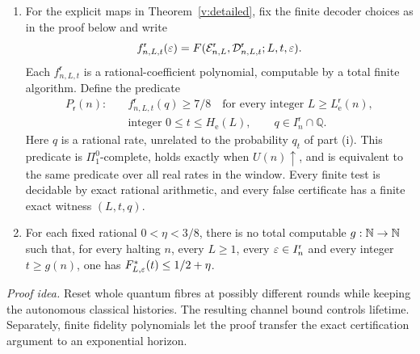 \begin{proposition}
\begin{enumerate}
\begin{equation}
 \quad(L\ge1),\qquad
 \tau_{L,\eps}<2^{L^5}
 \quad(L\ge k_{\mathsf r}j_n^{\mathsf r}+3).
\end{equation}
If \(U(n)\uparrow\), then for every
\(L\ge L_{\mathrm e}^{\mathsf r}(n)\),
\[
 H_{\mathrm e}(L)\le\tau_{L,\eps}
 <2^{(k_{\mathsf r}j_n^{\mathsf r}+3)L^4}.
\]
\item For the explicit maps in Theorem~\ref{v:detailed}, fix the finite
decoder choices as in the proof below and write
\[
 f^{\mathsf r}_{n,L,t}(\varepsilon)=
 F(\mathcal E^{\mathsf r}_{n,L},\mathcal D^{\mathsf r}_{n,L,t};L,t,\varepsilon).
\]
Each \(f^{\mathsf r}_{n,L,t}\) is a rational-coefficient polynomial,
computable by a total finite algorithm. Define the predicate
\begin{equation}\label{v:predicate}
\begin{split}
 P_{\mathsf r}(n):\quad& f^{\mathsf r}_{n,L,t}(q)\ge7/8
 \quad\text{for every integer }L\ge L_{\mathrm e}^{\mathsf r}(n),\\
 &\text{integer }0\le t\le H_{\mathrm e}(L),\qquad
  q\in I_n^{\mathsf r}\cap\mathbb Q.
\end{split}
\end{equation}
Here \(q\) is a rational rate, unrelated to the probability \(q_t\)
of part (i). This predicate is \(\Pi^0_1\)-complete, holds exactly
when \(U(n)\uparrow\), and is equivalent to the same predicate over
all real rates in the window.
Every finite test is decidable by exact rational arithmetic, and every
false certificate has a finite exact witness \((L,t,q)\).
\item For each fixed rational \(0<\eta<3/8\), there is no total
computable \(g:\mathbb N\to\mathbb N\) such that, for every halting \(n\), every
\(L\ge1\), every \(\varepsilon\in I_n^{\mathsf r}\) and every integer
\(t\ge g(n)\), one has \(F^*_{L,\varepsilon}(t)\le1/2+\eta\).
\end{enumerate}
\end{proposition}
\par\noindent\emph{Proof idea.} Reset whole quantum fibres at possibly different rounds while keeping the autonomous classical histories. The resulting channel bound controls lifetime. Separately, finite fidelity polynomials let the proof transfer the exact certification argument to an exponential horizon.

